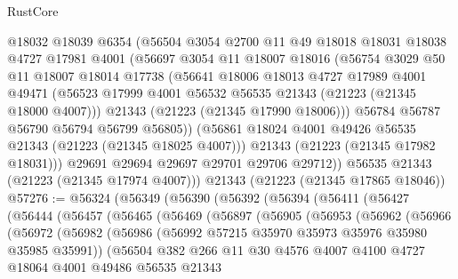 \begin{lexlean}{RustCore}
\begin{coremodule}
          @18032
          @18039
          @6354
          (@56504
            @3054
            @2700
            @11
            @49
            @18018
            @18031
            @18038
            @4727
            @17981
            @4001
            (@56697
              @3054
              @11
              @18007
              @18016
              (@56754
                @3029
                @50
                @11
                @18007
                @18014
                @17738
                (@56641
                  @18006
                  @18013
                  @4727
                  @17989
                  @4001
                  @49471
                  (@56523 @17999 @4001 @56532 @56535 @21343 (@21223 (@21345 @18000 @4007)))
                  @21343
                  (@21223 (@21345 @17990 @18006)))
                @56784
                @56787
                @56790
                @56794
                @56799
                @56805))
            (@56861 @18024 @4001 @49426 @56535 @21343 (@21223 (@21345 @18025 @4007)))
            @21343
            (@21223 (@21345 @17982 @18031)))
          @29691
          @29694
          @29697
          @29701
          @29706
          @29712))
      @56535
      @21343
      (@21223 (@21345 @17974 @4007)))
    @21343
    (@21223 (@21345 @17865 @18046))
@57276 := @56324
    (@56349
      (@56390
        (@56392
          (@56394
            (@56411
              (@56427
                (@56444
                  (@56457
                    (@56465
                      (@56469
                        (@56897
                          (@56905
                            (@56953
                              (@56962
                                (@56966
                                  (@56972
                                    (@56982
                                      (@56986
                                        (@56992 @57215 @35970 @35973 @35976 @35980 @35985 @35991))
                                      (@56504
                                        @382
                                        @266
                                        @11
                                        @30
                                        @4576
                                        @4007
                                        @4100
                                        @4727
                                        @18064
                                        @4001
                                        @49486
                                        @56535
                                        @21343

\end{coremodule}
\end{lexlean}
